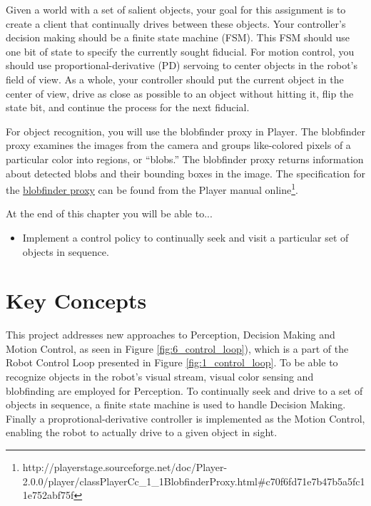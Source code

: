 Given a world with a set of salient objects, your goal for this assignment is to create a client that continually drives between 
these objects.  Your controller's decision making should be a finite state machine (FSM).  This FSM should use one bit of state to specify 
the currently sought fiducial.  For motion control, you should use proportional-derivative (PD) servoing to center objects in the robot's 
field of view.  As a whole, your controller should put the current object in the center of view, drive as close as possible to an object 
without hitting it, flip the state bit, and continue the process for the next fiducial.

For object recognition, you will use the blobfinder proxy in Player.  The blobfinder proxy examines the images from the camera and groups 
like-colored pixels of a particular color into regions, or ``blobs.''  The blobfinder proxy returns information about detected blobs and 
their bounding boxes in the image.  The specification for the 
\href{http://playerstage.sourceforge.net/doc/Player-2.0.0/player/group\_\_playerc\_\_proxy\_\_blobfinder.html}{blobfinder proxy} can be 
found from the Player manual 
online\footnote{http://playerstage.sourceforge.net/doc/Player-2.0.0/player/classPlayerCc\_1\_1BlobfinderProxy.html\#c70f6fd71e7b47b5a5fc11e752abf75f}.

\vspace{5 mm}

\noindent At the end of this chapter you will be able to...

\begin{itemize}
\item Implement a control policy to continually seek and visit a particular set of objects in sequence.
\end{itemize}

\section{Key Concepts}

\noindent This project addresses new approaches to Perception, Decision Making and Motion Control, as seen in Figure \ref{fig:6_control_loop}), which is a part of the Robot Control Loop presented in Figure \ref{fig:1_control_loop}. To be able to recognize objects in the robot's visual stream, visual color sensing and blobfinding are employed for Perception. To continually seek and drive to a set of objects in sequence, a finite state machine is used to handle Decision Making. Finally a proprotional-derivative controller is implemented as the Motion Control, enabling the robot to actually drive to a given object in sight.


